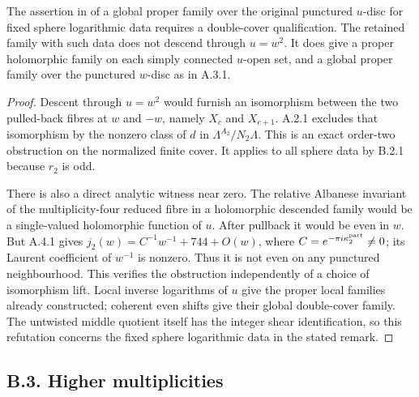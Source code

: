 \begin{proposition}\label{st:B.2.3}
The assertion in \cite[Remark 8.1]{E26} of a global proper family over the original punctured $u$-disc for fixed sphere logarithmic data requires a double-cover qualification. The retained family with such data does not descend through $u=w^2$. It does give a proper holomorphic family on each simply connected $u$-open set, and a global proper family over the punctured $w$-disc as in A.3.1.
\end{proposition}
\begin{proof}
Descent through $u=w^2$ would furnish an isomorphism between the two pulled-back fibres at $w$ and $-w$, namely $X_c$ and $X_{c+1}$. A.2.1 excludes that isomorphism by the nonzero class of $d$ in $\Lambda^{A_2}/N_2\Lambda$. This is an exact order-two obstruction on the normalized finite cover. It applies to all sphere data by B.2.1 because $r_2$ is odd.

There is also a direct analytic witness near zero. The relative Albanese invariant of the multiplicity-four reduced fibre in a holomorphic descended family would be a single-valued holomorphic function of $u$. After pullback it would be even in $w$. But A.4.1 gives $j_2(w)=C^{-1}w^{-1}+744+O(w)$, where $C=e^{-\pi i\kappa_2^{\rm part}}\ne0$; its Laurent coefficient of $w^{-1}$ is nonzero. Thus it is not even on any punctured neighbourhood. This verifies the obstruction independently of a choice of isomorphism lift. Local inverse logarithms of $u$ give the proper local families already constructed; coherent even shifts give their global double-cover family. The untwisted middle quotient itself has the integer shear identification, so this refutation concerns the fixed sphere logarithmic data in the stated remark.
\end{proof}

\subsection{B.3. Higher multiplicities}

